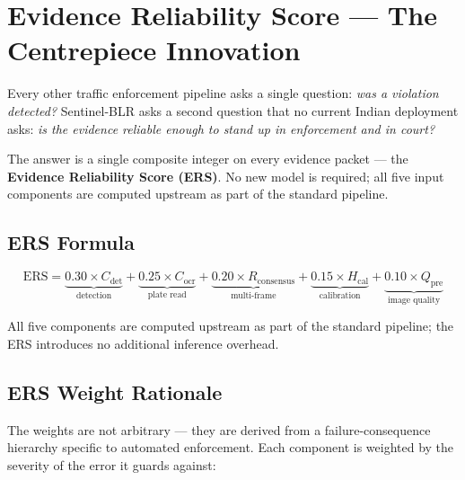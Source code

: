 \documentclass[11pt,a4paper]{article}
\begin{document}
\section{Evidence Reliability Score — The Centrepiece Innovation}
\label{sec:ers}

Every other traffic enforcement pipeline asks a single question: \textit{was a violation detected?} Sentinel-BLR asks a second question that no current Indian deployment asks: \textit{is the evidence reliable enough to stand up in enforcement and in court?}

The answer is a single composite integer on every evidence packet --- the \textbf{Evidence Reliability Score (ERS)}. No new model is required; all five input components are computed upstream as part of the standard pipeline.

\subsection*{ERS Formula}

\begin{equation}
\text{ERS} = \underbrace{0.30 \times C_{\text{det}}}_{\text{detection}} + \underbrace{0.25 \times C_{\text{ocr}}}_{\text{plate read}} + \underbrace{0.20 \times R_{\text{consensus}}}_{\text{multi-frame}} + \underbrace{0.15 \times H_{\text{cal}}}_{\text{calibration}} + \underbrace{0.10 \times Q_{\text{pre}}}_{\text{image quality}}
\end{equation}

\noindent All five components are computed upstream as part of the standard pipeline; the ERS introduces no additional inference overhead.

\subsection*{ERS Weight Rationale}

The weights are not arbitrary — they are derived from a failure-consequence hierarchy specific to automated enforcement. Each component is weighted by the severity of the error it guards against:
\end{document}
